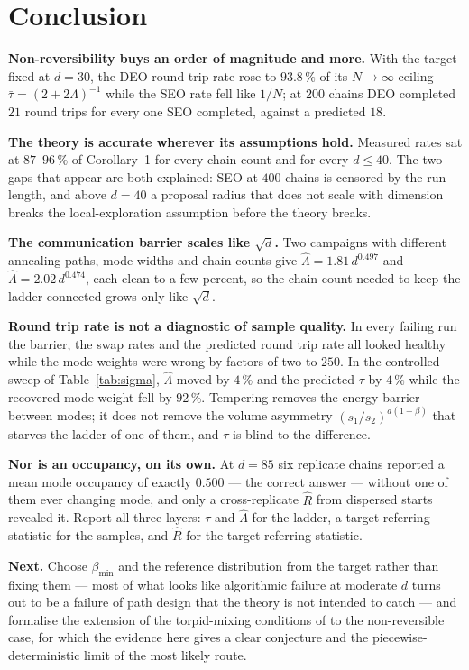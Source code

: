 \section{Conclusion}

\textbf{Non-reversibility buys an order of magnitude and more.} With the target
fixed at $d=30$, the DEO round trip rate rose to $93.8\,\%$ of its $N\to\infty$
ceiling $\bar\tau=(2+2\Lambda)^{-1}$ while the SEO rate fell like $1/N$; at $200$
chains DEO completed $21$ round trips for every one SEO completed, against a
predicted $18$.

\textbf{The theory is accurate wherever its assumptions hold.} Measured rates sat
at $87$--$96\,\%$ of Corollary~1 for every chain count and for every $d\le40$.
The two gaps that appear are both explained: SEO at $400$ chains is censored by
the run length, and above $d=40$ a proposal radius that does not scale with
dimension breaks the local-exploration assumption before the theory breaks.

\textbf{The communication barrier scales like $\sqrt d$.} Two campaigns with
different annealing paths, mode widths and chain counts give
$\hat\Lambda=1.81\,d^{0.497}$ and $\hat\Lambda=2.02\,d^{0.474}$, each clean to a
few percent, so the chain count needed to keep the ladder connected grows only
like $\sqrt d$.

\textbf{Round trip rate is not a diagnostic of sample quality.} In every failing
run the barrier, the swap rates and the predicted round trip rate all looked
healthy while the mode weights were wrong by factors of two to $250$. In the
controlled sweep of Table~\ref{tab:sigma}, $\hat\Lambda$ moved by $4\,\%$ and the
predicted $\tau$ by $4\,\%$ while the recovered mode weight fell by $92\,\%$.
Tempering removes the energy barrier between modes; it does not remove the volume
asymmetry $(s_1/s_2)^{d(1-\beta)}$ that starves the ladder of one of them, and
$\tau$ is blind to the difference.

\textbf{Nor is an occupancy, on its own.} At $d=85$ six replicate chains reported
a mean mode occupancy of exactly $0.500$ --- the correct answer --- without one of
them ever changing mode, and only a cross-replicate $\hat R$ from dispersed
starts revealed it. Report all three layers: $\tau$ and $\hat\Lambda$ for the
ladder, a target-referring statistic for the samples, and $\hat R$ for the
target-referring statistic.

\textbf{Next.} Choose $\beta_{\min}$ and the reference distribution from the
target rather than fixing them --- most of what looks like algorithmic failure at
moderate $d$ turns out to be a failure of path design that the theory is not
intended to catch --- and formalise the extension of the torpid-mixing conditions
of \citet{woodard2009torpid} to the non-reversible case, for which the evidence
here gives a clear conjecture and the piecewise-deterministic limit of
\citet{syed2022} the most likely route.
